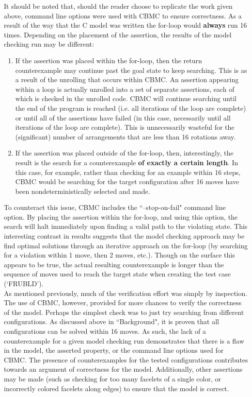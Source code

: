 \documentclass{article}
\begin{document}
\noindent It should be noted that, should the reader choose to replicate the work given above, command line options were used with CBMC to ensure correctness. As a result of the way that the C model was written the for-loop would \textbf{always} run 16 times. Depending on the placement of the assertion, the results of the model checking run may be different:

\begin{enumerate}
\item If the assertion was placed within the for-loop, then the return counterexample may continue past the goal state to keep searching. This is as a result of the unrolling that occurs within CBMC. An assertion appearing within a loop is actually unrolled into a set of separate assertions, each of which is checked in the unrolled code. CBMC will continue searching until the end of the program is reached (i.e. all iterations of the loop are complete) or until all of the assertions have failed (in this case, necessarily until all iterations of the loop are complete). This is unnecessarily wasteful for the (significant) number of arrangements that are less than 16 rotations away.
\item If the assertion was placed outside of the for-loop, then, interestingly, the result is the search for a counterexample \textbf{of exactly a certain length}. In this case, for example, rather than checking for an example within 16 steps, CBMC would be searching for the target configuration after 16 moves have been nondeterministically selected and made.
\end{enumerate}

\noindent To counteract this issue, CBMC includes the ``--stop-on-fail" command line option. By placing the assertion within the for-loop, and using this option, the search will halt immediately upon finding a valid path to the violating state. This interesting contrast in results suggests that the model checking approach may be find optimal solutions through an iterative approach on the for-loop (by searching for a violation within 1 move, then 2 moves, etc.). Though on the surface this appears to be true, the actual resulting counterexample is longer than the sequence of moves used to reach the target state when creating the test case (`FRUBLD').\\

\noindent As mentioned previously, much of the verification effort was simply by inspection. The use of CBMC, however, provided for more chances to verify the correctness of the model. Perhaps the simplest check was to just try searching from different configurations. As discussed above in ``Background", it is proven that all configurations can be solved within 16 moves. As such, the lack of a counterexample for a given model checking run demonstrates that there is a flaw in the model, the asserted property, or the command line options used for CBMC. The presence of counterexamples for the tested configurations contributes towards an argument of correctness for the model. Additionally, other assertions may be made (such as checking for too many facelets of a single color, or incorrectly colored facelets along edges) to ensure that the model is correct.
\end{document}
